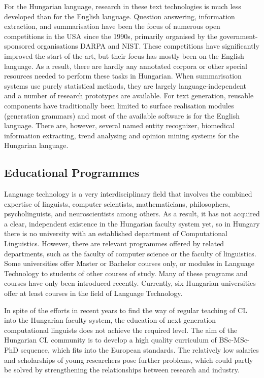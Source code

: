 \begin{multicols}{2}
  For the Hungarian language, research in these text technologies is much less developed than for the English language. Question answering, information extraction, and summarisation have been the focus of numerous open competitions in the USA since the 1990s, primarily organised by the government-sponsored organisations DARPA and NIST. These competitions have significantly improved the start-of-the-art, but their focus has mostly been on the English language. As a result, there are hardly any annotated corpora or other special resources needed to perform these tasks in Hungarian. When summarisation systems use purely statistical methods, they are largely language-independent and a number of research prototypes are available. For text generation, reusable components have traditionally been limited to surface realisation modules (generation grammars) and most of the available software is for the English language. There are, however, several named entity recognizer, biomedical information extracting, trend analysing and opinion mining systems for the Hungarian language.

  \subsection{Educational Programmes}

  Language technology is a very interdisciplinary field that involves the combined expertise of linguists, computer scientists, mathematicians, philosophers, psycholinguists, and neuroscientists among others. As a result, it has not acquired a clear, independent existence in the Hungarian faculty system yet, so in Hungary there is no university with an established department of Computational Linguistics. However, there are relevant programmes offered by related departments, such as the faculty of computer science or the faculty of linguistics. Some universities offer Master or Bachelor courses only, or modules in Language Technology to students of other courses of study. Many of these programs and courses have only been introduced recently. Currently, six Hungarian universities offer at least courses in the field of Language Technology.

  In spite of the efforts in recent years to find the way of regular teaching of CL into the Hungarian faculty system, the education of next generation computational linguists does not achieve the required level. The aim of the Hungarian CL community is to develop a high quality curriculum of BSc-MSc-PhD sequence, which fits into the European standards. The relatively low salaries and scholarships of young researchers pose further problems, which could partly be solved by strengthening the relationships between research and industry.


\end{multicols}
